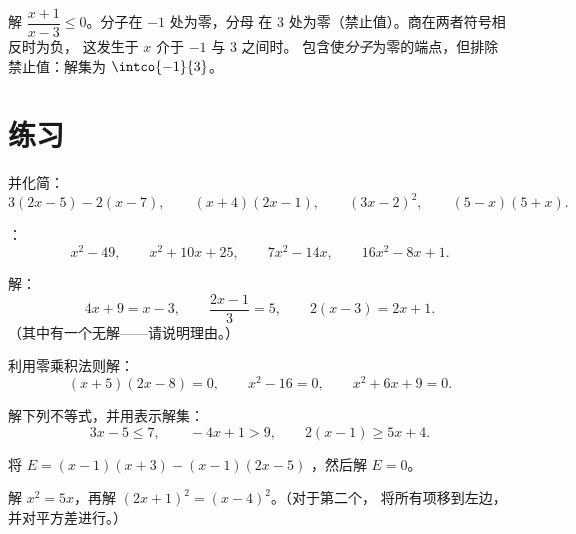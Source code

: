 \begin{example}\label{ex:g10:algebra:quotientineq}
解 $\dfrac{x + 1}{x - 3} \leq 0$。分子在 $-1$ 处为零，分母
在 $3$ 处为零（禁止值）。商在两者符号相反时为负，
这发生于 $x$ 介于 $-1$ 与 $3$ 之间时。
包含使\emph{分子}为零的端点，但排除
禁止值：解集为 $\intco{-1}{3}$。
\end{example}

\section{练习}

\begin{exercise}[$\star$]\label{exo:g10:algebra:1}
并化简：
\[
3(2x - 5) - 2(x - 7), \qquad
(x + 4)(2x - 1), \qquad
(3x - 2)^2, \qquad
(5 - x)(5 + x).
\]
\end{exercise}

\begin{exercise}[$\star$]\label{exo:g10:algebra:2}
：
\[
x^2 - 49, \qquad
x^2 + 10x + 25, \qquad
7x^2 - 14x, \qquad
16x^2 - 8x + 1 .
\]
\end{exercise}

\begin{exercise}[$\star$]\label{exo:g10:algebra:3}
解：
\[
4x + 9 = x - 3, \qquad
\frac{2x - 1}{3} = 5, \qquad
2(x - 3) = 2x + 1 .
\]
（其中有一个无解——请说明理由。）
\end{exercise}

\begin{exercise}[$\star$]\label{exo:g10:algebra:4}
利用零乘积法则解：
\[
(x + 5)(2x - 8) = 0, \qquad
x^2 - 16 = 0, \qquad
x^2 + 6x + 9 = 0 .
\]
\end{exercise}

\begin{exercise}[$\star$]\label{exo:g10:algebra:5}
解下列不等式，并用表示解集：
\[
3x - 5 \leq 7, \qquad
-4x + 1 > 9, \qquad
2(x - 1) \geq 5x + 4 .
\]
\end{exercise}

\begin{exercise}[$\star\star$]\label{exo:g10:algebra:6}
       将 $E = (x - 1)(x + 3) - (x - 1)(2x - 5)$ ，然后解 $E = 0$。
\end{exercise}

\begin{exercise}[$\star\star$]\label{exo:g10:algebra:7}
       解 $x^2 = 5x$，再解 $(2x + 1)^2 = (x - 4)^2$。（对于第二个，
       将所有项移到左边，并对平方差进行。）
\end{exercise}

